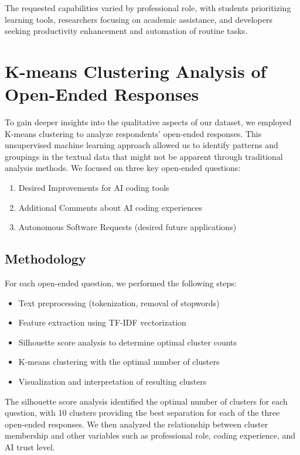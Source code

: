 \documentclass[conference]{IEEEtran}
\begin{document}
The requested capabilities varied by professional role, with students prioritizing learning tools, researchers focusing on academic assistance, and developers seeking productivity enhancement and automation of routine tasks.

\section{K-means Clustering Analysis of Open-Ended Responses}
To gain deeper insights into the qualitative aspects of our dataset, we employed K-means clustering to analyze respondents' open-ended responses. This unsupervised machine learning approach allowed us to identify patterns and groupings in the textual data that might not be apparent through traditional analysis methods. We focused on three key open-ended questions:

\begin{enumerate}
    \item Desired Improvements for AI coding tools
    \item Additional Comments about AI coding experiences
    \item Autonomous Software Requests (desired future applications)
\end{enumerate}

\subsection{Methodology}
For each open-ended question, we performed the following steps:
\begin{itemize}
    \item Text preprocessing (tokenization, removal of stopwords)
    \item Feature extraction using TF-IDF vectorization
    \item Silhouette score analysis to determine optimal cluster counts
    \item K-means clustering with the optimal number of clusters
    \item Visualization and interpretation of resulting clusters
\end{itemize}

The silhouette score analysis identified the optimal number of clusters for each question, with 10 clusters providing the best separation for each of the three open-ended responses. We then analyzed the relationship between cluster membership and other variables such as professional role, coding experience, and AI trust level.
\end{document}
